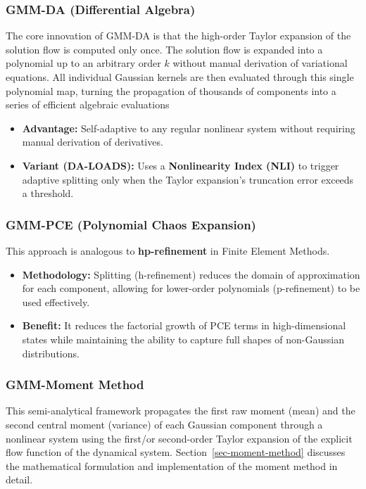 \documentclass[
  letterpaper,
  DIV=11,
  numbers=noendperiod,
  oneside]{scrartcl}
\begin{document}
\subsubsection{GMM-DA (Differential
Algebra)}\label{gmm-da-differential-algebra}

The core innovation of GMM-DA is that the high-order Taylor expansion of
the solution flow is computed only once. The solution flow is expanded
into a polynomial up to an arbitrary order \(k\) without manual
derivation of variational equations. All individual Gaussian kernels are
then evaluated through this single polynomial map, turning the
propagation of thousands of components into a series of efficient
algebraic evaluations

\begin{itemize}
\item
  \textbf{Advantage:} Self-adaptive to any regular nonlinear system
  without requiring manual derivation of derivatives.
\item
  \textbf{Variant (DA-LOADS):} Uses a \textbf{Nonlinearity Index (NLI)}
  to trigger adaptive splitting only when the Taylor expansion's
  truncation error exceeds a threshold.
\end{itemize}

\subsubsection{GMM-PCE (Polynomial Chaos
Expansion)}\label{gmm-pce-polynomial-chaos-expansion}

This approach is analogous to \textbf{hp-refinement} in Finite Element
Methods.

\begin{itemize}
\item
  \textbf{Methodology:} Splitting (h-refinement) reduces the domain of
  approximation for each component, allowing for lower-order polynomials
  (p-refinement) to be used effectively.
\item
  \textbf{Benefit:} It reduces the factorial growth of PCE terms in
  high-dimensional states while maintaining the ability to capture full
  shapes of non-Gaussian distributions.
\end{itemize}

\subsubsection{GMM-Moment Method}\label{gmm-moment-method}

This semi-analytical framework propagates the first raw moment (mean)
and the second central moment (variance) of each Gaussian component
through a nonlinear system using the first/or second-order Taylor
expansion of the explicit flow function of the dynamical system.
Section~\ref{sec-moment-method} discusses the mathematical formulation
and implementation of the moment method in detail.
\end{document}
